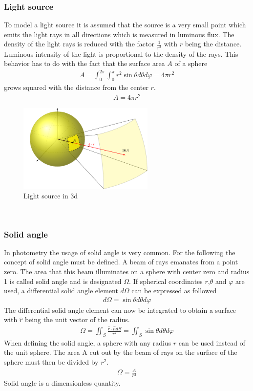 \subsubsection{Light source}
To model a light source it is assumed that the source is a very small point which emits the light rays in all directions which is measured in luminous flux. The density of the light rays is reduced with the factor $\frac{1}{r^2}$ with $r$ being the distance. Luminous intensity of the light is proportional to the density of the rays. This behavior has to do with the fact that the surface area $A$ of a sphere
\begin{align*}
A=\int_{0}^{2 \pi} \int_{0}^{\pi} r^{2} \sin \theta d \theta d \varphi=4 \pi r^{2}
\end{align*}
grows squared with the distance from the center $r$.
\begin{align*}
A = 4\pi r^2
\end{align*}
\begin{figure}[ht]
	\centering
	\includegraphics[width=0.6\textwidth]{2-theory/backlight/light.pdf}
	\caption{Light source in 3d\label{theory:light}}
\end{figure} 
\\
\subsubsection{Solid angle}
In photometry the usage of solid angle is very common. For the following the concept of solid angle must be defined. A beam of rays emanates from a point zero. The area that this beam illuminates on a sphere with center zero and radius 1 is called solid angle and is designated $\Omega$.
If spherical coordinates $r$,$\theta$ and $\varphi$ are used, a differential solid angle element $d \Omega$ can be expressed as followed
\begin{align*}
d \Omega=\sin \theta d \theta d \varphi
\end{align*}
The differential solid angle element can now be integrated to obtain a surface with $\hat{r}$ being the unit vector of the radius.
\begin{align*}
\Omega=\iint_{S} \frac{\hat{r} \cdot \hat{n} d S}{r^{2}}=\iint_{S} \sin \theta d \theta d \varphi
\end{align*}
When defining the solid angle, a sphere with any radius $r$ can be used instead of the unit sphere. The area A cut out by the beam of rays on the surface of the sphere must then be divided by $r^2$.
\begin{align*}
\Omega=\frac{A}{r^{2}}
\end{align*}
Solid angle is a dimensionless quantity.  

